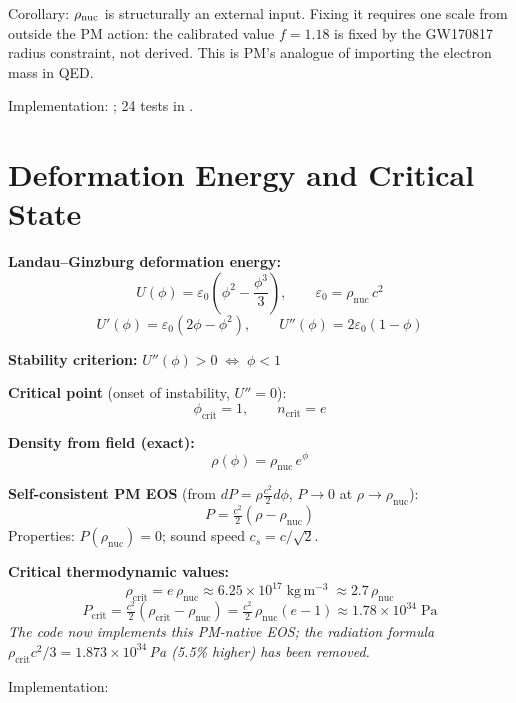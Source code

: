 \documentclass[10pt,twocolumn]{article}
\begin{document}
Corollary: $\rho_{\rm nuc}$ is structurally an external input.
Fixing it requires one scale from outside the PM action:
the calibrated value $f=1.18$ is fixed by the GW170817 radius constraint,
not derived.  This is PM's analogue of importing the electron mass in QED.

Implementation: ;
24 tests in .

\section{Deformation Energy and Critical State}

\textbf{Landau--Ginzburg deformation energy:}
\[
  U(\phi) = \varepsilon_0\!\left(\phi^2 - \frac{\phi^3}{3}\right),
  \qquad \varepsilon_0 = \rho_{\mathrm{nuc}}\,c^2
\]
\[
  U'(\phi) = \varepsilon_0(2\phi - \phi^2), \qquad
  U''(\phi) = 2\varepsilon_0(1-\phi)
\]

\textbf{Stability criterion:} $U''(\phi)>0 \;\Leftrightarrow\; \phi < 1$

\textbf{Critical point} (onset of instability, $U''=0$):
\[
  \boxed{\phi_{\mathrm{crit}} = 1, \qquad n_{\mathrm{crit}} = e}
\]

\textbf{Density from field (exact):}
\[
  \rho(\phi) = \rho_{\mathrm{nuc}}\,e^{\phi}
\]

\textbf{Self-consistent PM EOS} (from $dP = \rho\tfrac{c^2}{2}d\phi$, $P\to 0$ at $\rho\to\rho_{\mathrm{nuc}}$):
\[
  \boxed{P = \tfrac{c^2}{2}\!\left(\rho - \rho_{\mathrm{nuc}}\right)}
\]
Properties: $P(\rho_{\mathrm{nuc}})=0$; sound speed $c_s = c/\sqrt{2}$.

\textbf{Critical thermodynamic values:}
\[
  \rho_{\mathrm{crit}}
  = e\,\rho_{\mathrm{nuc}} \approx 6.25\times10^{17}\;\mathrm{kg\,m^{-3}}
  \;\approx 2.7\,\rho_{\mathrm{nuc}}
\]
\[
  P_{\mathrm{crit}}
    = \tfrac{c^2}{2}(\rho_{\mathrm{crit}} - \rho_{\mathrm{nuc}})
    = \tfrac{c^2}{2}\,\rho_{\mathrm{nuc}}(e-1)
    \approx 1.78\times10^{34}\;\mathrm{Pa}
\]
\emph{The code now implements this PM-native EOS; the radiation formula
$\rho_{\mathrm{crit}}c^2/3 = 1.873\times10^{34}$\,Pa (5.5\% higher) has been
removed.}

Implementation: 

\end{document}
